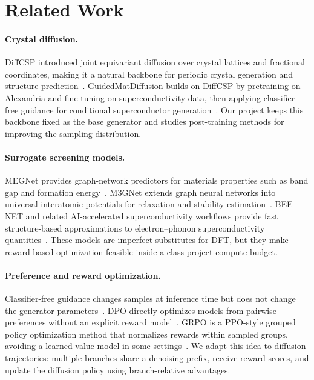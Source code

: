 \documentclass{article}
\begin{document}
\section{Related Work}
\paragraph{Crystal diffusion.}
DiffCSP introduced joint equivariant diffusion over crystal lattices and fractional coordinates, making it a natural backbone for periodic crystal generation and structure prediction~\citep{jiao2023diffcsp}. GuidedMatDiffusion builds on DiffCSP by pretraining on Alexandria and fine-tuning on superconductivity data, then applying classifier-free guidance for conditional superconductor generation~\citep{prakash2025guidedmatdiffusion}. Our project keeps this backbone fixed as the base generator and studies post-training methods for improving the sampling distribution.

\paragraph{Surrogate screening models.}
MEGNet provides graph-network predictors for materials properties such as band gap and formation energy~\citep{chen2019megnet}. M3GNet extends graph neural networks into universal interatomic potentials for relaxation and stability estimation~\citep{chen2022m3gnet}. BEE-NET and related AI-accelerated superconductivity workflows provide fast structure-based approximations to electron--phonon superconductivity quantities~\citep{gibson2025workflow}. These models are imperfect substitutes for DFT, but they make reward-based optimization feasible inside a class-project compute budget.

\paragraph{Preference and reward optimization.}
Classifier-free guidance changes samples at inference time but does not change the generator parameters~\citep{ho2022classifierfree}. DPO directly optimizes models from pairwise preferences without an explicit reward model~\citep{rafailov2023dpo}. GRPO is a PPO-style grouped policy optimization method that normalizes rewards within sampled groups, avoiding a learned value model in some settings~\citep{shao2024deepseekmath}. We adapt this idea to diffusion trajectories: multiple branches share a denoising prefix, receive reward scores, and update the diffusion policy using branch-relative advantages.
\end{document}
